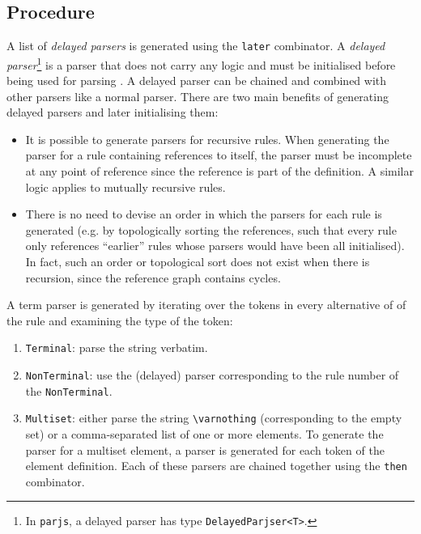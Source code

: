 \subsection{Procedure}
\label{term:procedure}
A list of \textit{delayed parsers} is generated using the \lstinline{later} combinator. A \textit{delayed parser}\footnote{In \lstinline{parjs}, a delayed parser has type \lstinline{DelayedParjser<T>}.} is a parser that does not carry any logic and must be initialised before being used for parsing \cite{parjs}. A delayed parser can be chained and combined with other parsers like a normal parser. There are two main benefits of generating delayed parsers and later initialising them:
\begin{itemize}
    \item It is possible to generate parsers for recursive rules. When generating the parser for a rule containing references to itself, the parser must be incomplete at any point of reference since the reference is part of the definition. A similar logic applies to mutually recursive rules.
    \item There is no need to devise an order in which the parsers for each rule is generated (e.g. by topologically sorting the references, such that every rule only references ``earlier'' rules whose parsers would have been all initialised). In fact, such an order or topological sort does not exist when there is recursion, since the reference graph contains cycles.
\end{itemize}
A term parser is generated by iterating over the tokens in every alternative of of the rule and examining the type of the token:
\begin{enumerate}
    \item \lstinline{Terminal}: parse the string verbatim.
    \item \lstinline{NonTerminal}: use the (delayed) parser corresponding to the rule number of the \lstinline{NonTerminal}.
    \item \lstinline{Multiset}: either parse the string \lstinline{\varnothing} (corresponding to the empty set) or a comma-separated list of one or more elements. To generate the parser for a multiset element, a parser is generated for each token of the element definition. Each of these parsers are chained together using the \lstinline{then} combinator.
\end{enumerate}
